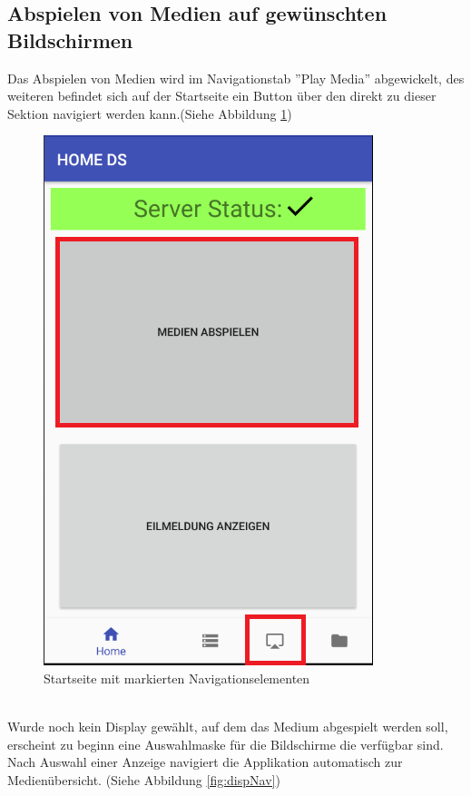 \subsection{Abspielen von Medien auf gewünschten Bildschirmen}
Das Abspielen von Medien wird im Navigationstab ''Play Media'' abgewickelt, des weiteren befindet sich auf der Startseite ein Button über den direkt zu dieser Sektion navigiert werden kann.(Siehe Abbildung \ref{fig:mediaNav})
\\
\begin{figure}[H]
\centering
\includegraphics[scale=0.35]{images/06_AndroidApp/06_mediaNavigation}
\caption{Startseite mit markierten Navigationselementen}
\label{fig:mediaNav}
\end{figure}
\\
Wurde noch kein Display gewählt, auf dem das Medium abgespielt werden soll, erscheint zu beginn eine Auswahlmaske für die Bildschirme die verfügbar sind. Nach Auswahl einer Anzeige navigiert die Applikation automatisch zur Medienübersicht. (Siehe Abbildung \ref{fig:dispNav})
\\
